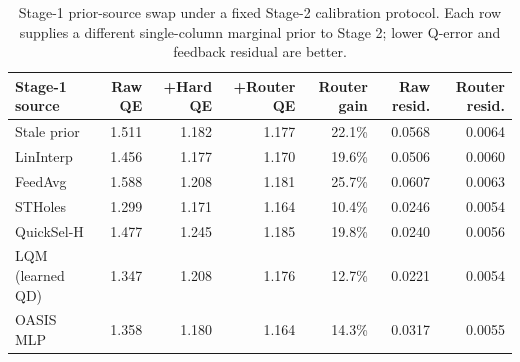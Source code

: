 \begin{table}[t]
  \centering
  \small
  \caption{Stage-1 prior-source swap under a fixed Stage-2 calibration protocol. Each row supplies a different single-column marginal prior to Stage 2; lower Q-error and feedback residual are better.}
  \label{tab:stage1_estimator_swap}
  \setlength{\tabcolsep}{4pt}
  \begin{tabular}{lrrrrrr}
    \toprule
    Stage-1 source & Raw QE & +Hard QE & +Router QE & Router gain & Raw resid. & Router resid. \\
    \midrule
    Stale prior & 1.511 & 1.182 & 1.177 & 22.1\% & 0.0568 & 0.0064 \\
    LinInterp & 1.456 & 1.177 & 1.170 & 19.6\% & 0.0506 & 0.0060 \\
    FeedAvg & 1.588 & 1.208 & 1.181 & 25.7\% & 0.0607 & 0.0063 \\
    STHoles & 1.299 & 1.171 & 1.164 & 10.4\% & 0.0246 & 0.0054 \\
    QuickSel-H & 1.477 & 1.245 & 1.185 & 19.8\% & 0.0240 & 0.0056 \\
    LQM (learned QD) & 1.347 & 1.208 & 1.176 & 12.7\% & 0.0221 & 0.0054 \\
    OASIS MLP & 1.358 & 1.180 & 1.164 & 14.3\% & 0.0317 & 0.0055 \\
    \bottomrule
  \end{tabular}
\end{table}
